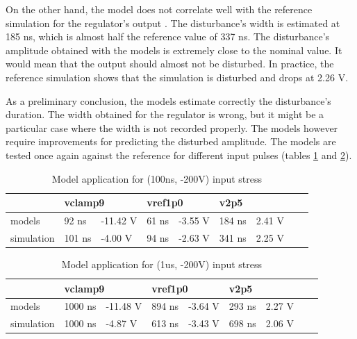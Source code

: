 On the other hand, the model does not correlate well with the reference simulation for the regulator's output .
The disturbance's width is estimated at 185 ns, which is almost half the reference value of 337 ns.
The disturbance's amplitude obtained with the models is extremely close to the nominal value.
It would mean that the output should almost not be disturbed.
In practice, the reference simulation shows that the simulation is disturbed and drops at 2.26 V.

As a preliminary conclusion, the models estimate correctly the disturbance's duration.
The width obtained for the regulator is wrong, but it might be a particular case where the width is not recorded properly.
The models however require improvements for predicting the disturbed amplitude.
The models are tested once again against the reference for different input pulses (tables \ref{tab:model-v2-vs-sim-2} and \ref{tab:model-v2-vs-sim-3}).

\begin{table}[!h]
\centering
\begin{tabular}{@{}lllllllll@{}}
           & \multicolumn{2}{l}{vclamp9}           & \multicolumn{2}{l}{vref1p0} & \multicolumn{2}{l}{v2p5} \\
\toprule
models     & 92 ns  & \textcolor{red!90}{-11.42 V} & 61 ns       & -3.55 V       & \textcolor{red!90}{184 ns} & \textcolor{blue!90}{2.41 V}     \\
simulation & 101 ns & -4.00 V                      & 94 ns       & -2.63 V       & 341 ns                     & 2.25 V
\end{tabular}
\caption{Model application for (100ns, -200V) input stress}
\label{tab:model-v2-vs-sim-2}
\end{table}

\begin{table}[!h]
\centering
\begin{tabular}{@{}lllllllll@{}}
           & \multicolumn{2}{l}{vclamp9}            & \multicolumn{2}{l}{vref1p0} & \multicolumn{2}{l}{v2p5} \\
\toprule
models     & 1000 ns & \textcolor{red!90}{-11.48 V} & 894 ns       & -3.64 V      & \textcolor{red!90}{293 ns}  & 2.27 V     \\
simulation & 1000 ns & -4.87 V                      & 613 ns       & -3.43 V      & 698 ns                      & 2.06 V
\end{tabular}
\caption{Model application for (1us, -200V) input stress}
\label{tab:model-v2-vs-sim-3}
\end{table}

